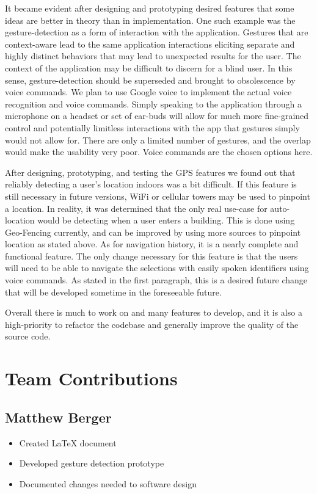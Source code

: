 \documentclass{scrreprt}
\begin{document}
It became evident after designing and prototyping desired features that some ideas are better in theory than in implementation. One such example was the gesture-detection as a form of interaction with the application. Gestures that are context-aware lead to the same application interactions eliciting separate and highly distinct behaviors that may lead to unexpected results for the user. The context of the application may be difficult to discern for a blind user. In this sense, gesture-detection should be superseded and brought to obsolescence by voice commands. We plan to use Google voice to implement the actual voice recognition and voice commands. Simply speaking to the application through a microphone on a headset or set of ear-buds will allow for much more fine-grained control and potentially limitless interactions with the app that gestures simply would not allow for. There are only a limited number of gestures, and the overlap would make the usability very poor. Voice commands are the chosen options here.

After designing, prototyping, and testing the GPS features we found out that reliably detecting a user's location indoors was a bit difficult. If this feature is still necessary in future versions, WiFi or cellular towers may be used to pinpoint a location. In reality, it was determined that the only real use-case for auto-location would be detecting when a user enters a building. This is done using Geo-Fencing currently, and can be improved by using more sources to pinpoint location as stated above. As for navigation history, it is a nearly complete and functional feature. The only change necessary for this feature is that the users will need to be able to navigate the selections with easily spoken identifiers using voice commands. As stated in the first paragraph, this is a desired future change that will be developed sometime in the foreseeable future.

Overall there is much to work on and many features to develop, and it is also a high-priority to refactor the codebase and generally improve the quality of the source code.

\chapter{Team Contributions}
	\section{Matthew Berger}
		\begin{itemize}
			\item Created LaTeX document
			\item Developed gesture detection prototype
			\item Documented changes needed to software design
		\end{itemize}
\end{document}
